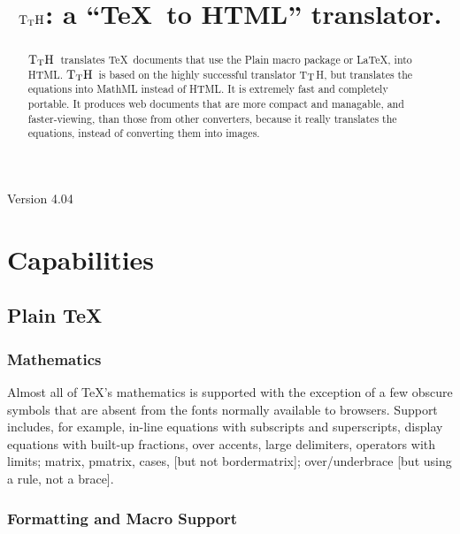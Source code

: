 \documentclass[12pt]{article}
\def\TtH{$\rm{}T_TH$}
\begin{document}
\title{\TtH: a ``\TeX\ to HTML'' translator.}
\centerline{Version 4.04}
\author{}\date{}
\maketitle

\begin{abstract}
\TtH\ translates \TeX\ documents that use the Plain macro package or
\LaTeX, into HTML\ifx\TtMgold\undefined\else.
\TtH\ is based on the highly successful translator 
T$_{\rm T}$H, but translates the equations into MathML instead of HTML\fi.
 It is extremely fast and completely portable. It
produces web documents that are more compact and managable, and
faster-viewing, than those from other converters, because it really
translates the equations, instead of converting them into images.
\end{abstract}

\tableofcontents

\section{Capabilities}

\subsection{Plain \TeX}


\subsubsection{Mathematics}

Almost all of \TeX's mathematics is supported with the exception of a
few obscure symbols that are absent from the fonts normally available
to browsers. Support includes, for example, in-line equations with
subscripts and superscripts, display equations with built-up
fractions, over accents, large delimiters, operators with limits;
matrix, pmatrix, cases, [but not bordermatrix]; over/underbrace [but
using a rule, not a brace].

\subsubsection{Formatting and Macro Support}
\end{document}
